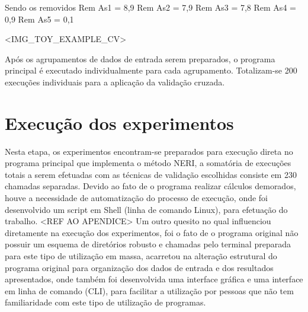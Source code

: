 Sendo os removidos
Rem As1 = 8,9
Rem As2 = 7,9
Rem As3 = 7,8
Rem As4 = 0,9
Rem As5 = 0,1 

<IMG_TOY_EXAMPLE_CV>

Após os agrupamentos de dados de entrada serem preparados, o programa principal é executado individualmente para cada agrupamento. Totalizam-se 200 execuções individuais para a aplicação da validação cruzada.


\section{Execução dos experimentos}

Nesta etapa, os experimentos encontram-se preparados para execução direta no programa principal que implementa o método NERI, a somatória de execuções totais a serem efetuadas com as técnicas de validação escolhidas consiste em 230 chamadas separadas.
Devido ao fato de o programa realizar cálculos demorados, houve a necessidade de automatização do processo de execução, onde foi desenvolvido um script em Shell (linha de comando Linux), para efetuação do trabalho. <REF AO APENDICE>
Um outro quesito no qual influenciou diretamente na execução dos experimentos, foi o fato de o programa original não possuir um esquema de diretórios robusto e chamadas pelo terminal preparada para este tipo de utilização em massa, acarretou na alteração estrutural do programa original para organização dos dados de entrada e dos resultados apresentados, onde também foi desenvolvida uma interface gráfica e uma interface em linha de comando (CLI), para facilitar a utilização por pessoas que não tem familiaridade com este tipo de utilização de programas.



